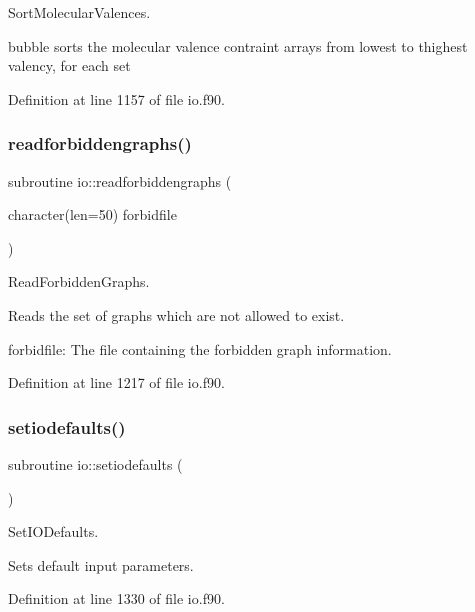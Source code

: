 Sort\+Molecular\+Valences. 

bubble sorts the molecular valence contraint arrays from lowest to thighest valency, for each set 

Definition at line 1157 of file io.\+f90.

\mbox{\label{namespaceio_a2f1df2054a4fbfd76d2351f26f6b4b02}} 
\subsubsection{\texorpdfstring{readforbiddengraphs()}{readforbiddengraphs()}}
{\footnotesize\ttfamily subroutine io\+::readforbiddengraphs (\begin{DoxyParamCaption}\item[{character(len=50)}]{forbidfile }\end{DoxyParamCaption})}



Read\+Forbidden\+Graphs. 

Reads the set of graphs which are not allowed to exist.


\begin{DoxyItemize}
\item forbidfile\+: The file containing the forbidden graph information. 
\end{DoxyItemize}

Definition at line 1217 of file io.\+f90.

\mbox{\label{namespaceio_aea679911d5618f57aaa7a3daa238ec13}} 
\subsubsection{\texorpdfstring{setiodefaults()}{setiodefaults()}}
{\footnotesize\ttfamily subroutine io\+::setiodefaults (\begin{DoxyParamCaption}{ }\end{DoxyParamCaption})}



Set\+I\+O\+Defaults. 

Sets default input parameters. 

Definition at line 1330 of file io.\+f90.

